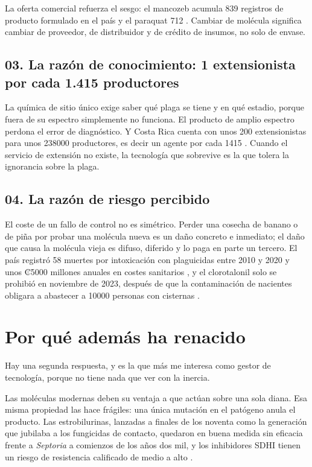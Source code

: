 \documentclass[11pt,letterpaper]{article}
\begin{document}
La oferta comercial refuerza el sesgo: el mancozeb acumula 839 registros de
producto formulado en el país y el paraquat 712 \parencite{vargas2021}. Cambiar
de molécula significa cambiar de proveedor, de distribuidor y de crédito de
insumos, no solo de envase.

\subsection*{03. La razón de conocimiento: 1 extensionista por cada 1.415
productores}

La química de sitio único exige saber qué plaga se tiene y en qué estadio, porque
fuera de su espectro simplemente no funciona. El producto de amplio espectro
perdona el error de diagnóstico. Y Costa Rica cuenta con unos 200 extensionistas
para unos \num{238000} productores, es decir un agente por cada \num{1415}
\parencite{delfino2023}. Cuando el servicio de extensión no existe, la tecnología
que sobrevive es la que tolera la ignorancia sobre la plaga.

\subsection*{04. La razón de riesgo percibido}

El coste de un fallo de control no es simétrico. Perder una cosecha de banano o
de piña por probar una molécula nueva es un daño concreto e inmediato; el daño
que causa la molécula vieja es difuso, diferido y lo paga en parte un tercero.
El país registró 58 muertes por intoxicación con plaguicidas entre 2010 y 2020 y
unos ₡\num{5000} millones anuales en costes sanitarios \parencite{delfino2023},
y el clorotalonil solo se prohibió en noviembre de 2023, después de que la
contaminación de nacientes obligara a abastecer a \num{10000} personas con
cisternas \parencite{delfino2023clorotalonil}.

\section{Por qué además ha renacido}

Hay una segunda respuesta, y es la que más me interesa como gestor de tecnología,
porque no tiene nada que ver con la inercia.

Las moléculas modernas deben su ventaja a que actúan sobre una sola diana. Esa
misma propiedad las hace frágiles: una única mutación en el patógeno anula el
producto. Las estrobilurinas, lanzadas a finales de los noventa como la
generación que jubilaba a los fungicidas de contacto, quedaron en buena medida
sin eficacia frente a \emph{Septoria} a comienzos de los años dos mil, y los
inhibidores SDHI tienen un riesgo de resistencia calificado de medio a alto
\parencite{ahdb2023}.
\end{document}
